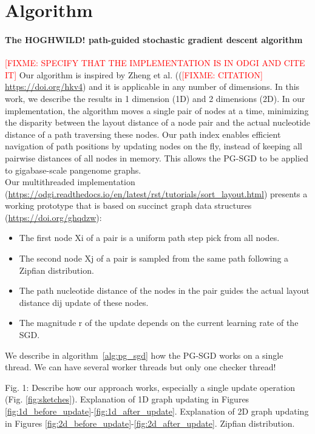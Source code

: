 \documentclass{bioinfo}
\theoremstyle{definition}
\newcommand{\red}[1]{{\textcolor{Red}{#1}}}
\newcommand{\FIXME}[1]{\red{[FIXME: #1]}}
\begin{document}
    \section{Algorithm}

    \paragraph{The HOGHWILD! path-guided stochastic gradient descent algorithm}
    \FIXME{SPECIFY THAT THE IMPLEMENTATION IS IN ODGI AND CITE IT}
    Our algorithm is inspired by Zheng et al. ((\FIXME{CITATION} \url{https://doi.org/hkv4}) and it is applicable in any number of dimensions.
    In this work, we describe the results in 1 dimension (1D) and 2 dimensions (2D).
    In our implementation, the algorithm moves a single pair of nodes at a time, minimizing the disparity between the layout distance of a node pair and the actual nucleotide distance of a path traversing these nodes.
    Our path index enables efficient navigation of path positions by updating nodes on the fly, instead of keeping all pairwise distances of all nodes in memory.
    This allows the PG-SGD to be applied to gigabase-scale pangenome graphs. \\
    Our multithreaded implementation (\url{https://odgi.readthedocs.io/en/latest/rst/tutorials/sort_layout.html}) presents a working prototype that is based on succinct graph data structures (\url{https://doi.org/ghqdzw}):
    \begin{itemize}
        \item The first node Xi of a pair is a uniform path step pick from all nodes.
        \item The second node Xj of a pair is sampled from the same path following a Zipfian distribution.
        \item The path nucleotide distance of the nodes in the pair guides the actual layout distance dij update of these nodes.
        \item The magnitude r of the update depends on the current learning rate of the SGD.
    \end{itemize}
    We describe in algorithm~\ref{alg:pg_sgd} how the PG-SGD works on a single thread.
    We can have several worker threads but only one checker thread!

    

    \iffalse
    Fig. 1: Describe how our approach works, especially a single update operation (Fig. \ref{fig:sketches}). Explanation of 1D graph updating in Figures \ref{fig:1d_before_update}-\ref{fig:1d_after_update}. Explanation of 2D graph updating in Figures \ref{fig:2d_before_update}-\ref{fig:2d_after_update}. Zipfian distribution.
\end{document}
